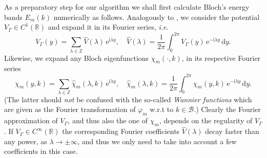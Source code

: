 \documentclass[leqno,final]{siamltex}
\numberwithin{equation}{section}
\newcounter{me}
\begin{document}
As a preparatory step for our algorithm we shall first calculate
Bloch's energy bands $E_m(k)$ numerically as follows. Analogously
to  \cite{GoMa, Ko}, we consider the potential $V_{\Gamma}\in C^1({{\mathbb R}})$
and expand it in its Fourier series, {{\sl i.e.\/ }} \begin{equation}\label{Vgm}
V_{\Gamma}(y)=\sum_{\lambda \in{{\mathbb Z }}}\widehat V(\lambda) \, {\mathrm{e}}^{{\mathrm{i}}
\lambda y},\quad \widehat V(\lambda)
={\frac{{1}}{{2\pi}}}\int_0^{2\pi}V_{\Gamma}(y)\, {\mathrm{e}}^{-{\mathrm{i}} \lambda y }\, {{\mathrm {d}}} y.
\end{equation} Likewise, we expand any Bloch eigenfunctions
$\chi_m(\cdot,k)$, in its respective Fourier series
\begin{equation}\label{chiFourier} \chi_m(y,k)=\sum_{\lambda \in{{\mathbb Z }}}\widehat
\chi_m(\lambda, k)\, {\mathrm{e}}^{{\mathrm{i}} \lambda y},\quad \widehat
\chi_m(\lambda, k)={\frac{{1}}{{2\pi}}}\int_0^{2\pi}\chi_m(y,k)\, {\mathrm{e}}^{-{\mathrm{i}}
\lambda y}\, {{\mathrm {d}}} y. \end{equation} (The latter should \emph{not} be confused
with the so-called \emph{Wannier functions} which are given as the
Fourier transformation of $\varphi_m$ w.r.t to $k \in \mathcal
B$.) Clearly the Fourier approximation of $V_\Gamma$, and thus
also the one of $\chi_m$, depends on the regularity of $V_\Gamma$.
If $V_\Gamma \in C^\infty({{\mathbb R}})$ the corresponding Fourier
coefficients $\widehat V(\lambda)$ decay faster than any power, as
$\lambda \to \pm \infty$, and thus we only need to take into
account a few coefficients in this case.
\end{document}
